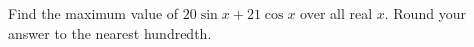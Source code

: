 Find the maximum value of $20\sin x+21\cos x$ over all real $x$. Round your answer to the nearest hundredth.

